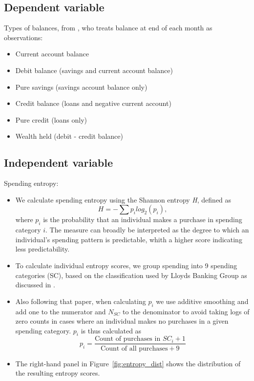 \subsection{Dependent variable}%
\label{sub:dependent_variable}

Types of balances, from \citet{becker2017does}, who treats balance at end of
each month as observations:

\begin{itemize}
    \item Current account balance
    \item Debit balance (savings and current account balance)
    \item Pure savings (savings account balance only)
    \item Credit balance (loans and negative current account)
    \item Pure credit (loans only)
    \item Wealth held (debit - credit balance)
\end{itemize}


\subsection{Independent variable}%
\label{sub:independent_variable}


Spending entropy:
\begin{itemize}
    \item We calculate spending entropy using the Shannon entropy
        \textit{H}\citep{shannon1948mathematical}, defined as
        \begin{equation}
            H = -\sum{p_i}log_2(p_i),
        \end{equation}
        where $p_i$ is the probability that an
        individual makes a purchase in spending category $i$. The measure can
        broadly be interpreted as the degree to which an individual's spending
        pattern is predictable, whith a higher score indicating less
        predictability.

    \item To calculate individual entropy scores, we group spending into 9
        spending categories (SC), based on the classification used
        by Lloyds Banking Group as discussed in \citet{muggleton2020evidence}.

    \item Also following that paper, when calculating $p_i$ we use additive
        smoothing and add one to the numerator and $N_{SC}$ to the denominator
        to avoid taking logs of zero counts in cases where an individual makes
        no purchases in a given spending category. $p_i$ is thus calculated as
        \begin{equation}
            p_i = \frac{\text{Count of purchases in $SC_i$} + 1}{\text{Count of
            all purchases} + 9}
        \end{equation}

    \item The right-hand panel in Figure~\ref{fig:entropy_dist} shows the
        distribution of the resulting entropy scores.
\end{itemize}

